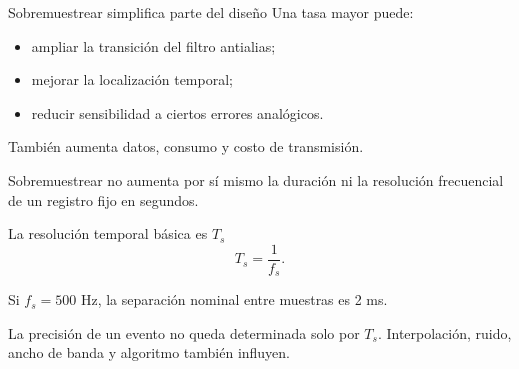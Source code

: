\documentclass[
  ignorenonframetext,
  aspectratio=169,
  spanish,
]{beamer}
\providecommand{\tightlist}{%
  \setlength{\itemsep}{0pt}\setlength{\parskip}{0pt}}
\begin{document}
\begin{frame}{Sobremuestrear simplifica parte del diseño}
  \protect{}\label{sobremuestrear-simplifica-parte-del-diseuxf1o}
  Una tasa mayor puede:

  \begin{itemize}
    \tightlist
    \item
          ampliar la transición del filtro antialias;
    \item
          mejorar la localización temporal;
    \item
          reducir sensibilidad a ciertos errores analógicos.
  \end{itemize}

  También aumenta datos, consumo y costo de transmisión.

  \begin{tcolorbox}[enhanced jigsaw, arc=.35mm, bottomrule=.15mm, bottomtitle=1mm, breakable, colback=white, colbacktitle=quarto-callout-note-color!10!white, colframe=quarto-callout-note-color-frame, coltitle=black, left=2mm, leftrule=.75mm, opacityback=0, opacitybacktitle=0.6, rightrule=.15mm, title=\textcolor{quarto-callout-note-color}{\faInfo}\hspace{0.5em}{Nota}, titlerule=0mm, toprule=.15mm, toptitle=1mm]

    Sobremuestrear no aumenta por sí mismo la duración ni la resolución
    frecuencial de un registro fijo en segundos.

  \end{tcolorbox}
\end{frame}

\begin{frame}{La resolución temporal básica es \(T_s\)}
  \protect{}\label{la-resoluciuxf3n-temporal-buxe1sica-es-t_s}
  \[T_s=\frac{1}{f_s}.\]

  Si \(f_s=500\) Hz, la separación nominal entre muestras es 2 ms.

  \begin{tcolorbox}[enhanced jigsaw, arc=.35mm, bottomrule=.15mm, bottomtitle=1mm, breakable, colback=white, colbacktitle=quarto-callout-warning-color!10!white, colframe=quarto-callout-warning-color-frame, coltitle=black, left=2mm, leftrule=.75mm, opacityback=0, opacitybacktitle=0.6, rightrule=.15mm, title=\textcolor{quarto-callout-warning-color}{\faExclamationTriangle}\hspace{0.5em}{Advertencia}, titlerule=0mm, toprule=.15mm, toptitle=1mm]

    La precisión de un evento no queda determinada solo por \(T_s\).
    Interpolación, ruido, ancho de banda y algoritmo también influyen.

  \end{tcolorbox}
\end{frame}
\end{document}
